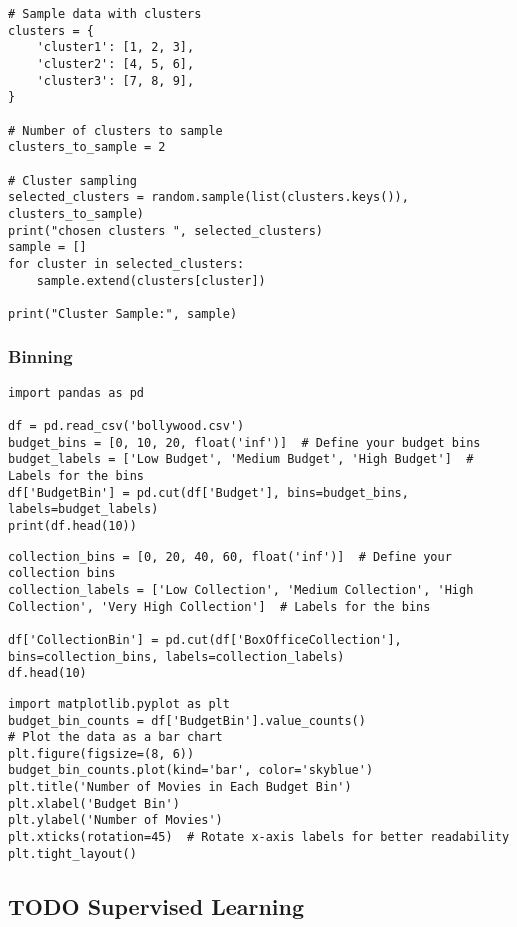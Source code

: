 \documentclass[11pt]{article}
\begin{document}
\begin{enumerate}
\begin{verbatim}
# Sample data with clusters
clusters = {
    'cluster1': [1, 2, 3],
    'cluster2': [4, 5, 6],
    'cluster3': [7, 8, 9],
}

# Number of clusters to sample
clusters_to_sample = 2

# Cluster sampling
selected_clusters = random.sample(list(clusters.keys()), clusters_to_sample)
print("chosen clusters ", selected_clusters)
sample = []
for cluster in selected_clusters:
    sample.extend(clusters[cluster])

print("Cluster Sample:", sample)
\end{verbatim}
\end{enumerate}
\subsubsection{Binning}
\label{sec:org038f58a}
\begin{verbatim}
import pandas as pd

df = pd.read_csv('bollywood.csv')
budget_bins = [0, 10, 20, float('inf')]  # Define your budget bins
budget_labels = ['Low Budget', 'Medium Budget', 'High Budget']  # Labels for the bins
df['BudgetBin'] = pd.cut(df['Budget'], bins=budget_bins, labels=budget_labels)
print(df.head(10))
\end{verbatim}

\begin{verbatim}
collection_bins = [0, 20, 40, 60, float('inf')]  # Define your collection bins
collection_labels = ['Low Collection', 'Medium Collection', 'High Collection', 'Very High Collection']  # Labels for the bins

df['CollectionBin'] = pd.cut(df['BoxOfficeCollection'], bins=collection_bins, labels=collection_labels)
df.head(10)
\end{verbatim}

\begin{verbatim}
import matplotlib.pyplot as plt
budget_bin_counts = df['BudgetBin'].value_counts()
# Plot the data as a bar chart
plt.figure(figsize=(8, 6))
budget_bin_counts.plot(kind='bar', color='skyblue')
plt.title('Number of Movies in Each Budget Bin')
plt.xlabel('Budget Bin')
plt.ylabel('Number of Movies')
plt.xticks(rotation=45)  # Rotate x-axis labels for better readability
plt.tight_layout()
\end{verbatim}
\subsection{{\bfseries\sffamily TODO} Supervised Learning}
\label{sec:orgd44bd0d}
\end{document}

